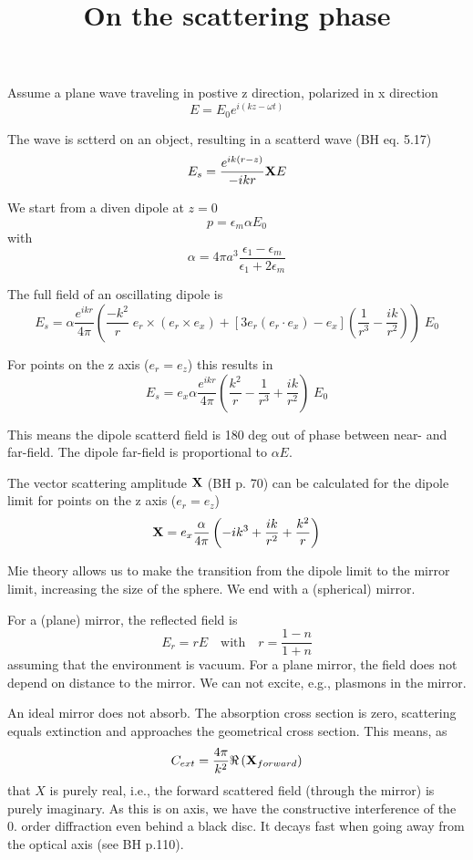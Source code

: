 \documentclass[a4paper,10pt]{article}
\title{On the scattering phase}
\author{}
\begin{document}
\maketitle

Assume a plane wave traveling in postive z direction, polarized in x direction
\[
 E = E_0 e^{ i (kz - \omega t) }
\]

The wave is sctterd on an object, resulting in a scatterd wave  (BH eq. 5.17)
\[
 E_s = \frac{e^{ik (r - z)}}{-i k r} {\bf X } E
\]


We start from a diven dipole at $z=0$
\[
 p = \epsilon_m \alpha E_0
\]
with
\[
 \alpha = 4 \pi a^3 \frac{\epsilon_1 - \epsilon_m}{\epsilon_1 + 2 \epsilon_m}
\]

The full field of an oscillating dipole is
\[
E_s = \alpha \frac{e^{i k r}}{4 \pi } \left(  
 \frac{-k^2}{r}  \; e_r \times  (e_r \times e_x)
 + \left[ 3 e_r (e_r \cdot e_x) - e_x \right]
\left( \frac{1}{r^3} - \frac{i k}{r^2} \right)
 \right) \; E_0
\]

For points on the z axis ($e_r = e_z$) this results in 
\[
E_s = e_x \alpha \frac{e^{i k r}}{4 \pi } \left(  
 \frac{ k^2}{r} 
 -
 \frac{1}{r^3} + \frac{i k}{r^2}  
 \right) \; E_0
\]

This means the dipole scatterd field is 180 deg out of phase between near- and
far-field. The dipole far-field is proportional to $\alpha E$.




The vector scattering amplitude $\bf{X}$  (BH p. 70) can be calculated for the
dipole limit for points on the z axis ($e_r = e_z$)
\[
 {\bf X} = e_x  \frac{\alpha}{4 \pi } \left(  
  -i k^3  
 +
 \frac{i k }{r^2} + \frac{ k^2}{r}  
 \right)  
\]

Mie theory allows us to make the transition from the dipole limit to the mirror
limit, increasing the size of the sphere. We end with a (spherical) mirror.

For a (plane) mirror, the reflected field is
\[
 E_r = r E  \quad \text{with} \quad r = \frac{1 - n}{ 1 + n}
\]
assuming that the environment is vacuum. For a plane mirror, the field does not
depend on distance to the mirror. We can not excite, e.g., plasmons in the
mirror.

An ideal mirror does not absorb. The absorption cross section is zero,
scattering equals extinction and approaches the geometrical cross section. This
means, as
\[
 C_{ext} = \frac{4 \pi}{k^2} \Re \left( {\bf X}_{forward} \right)
\]
that $X$ is purely real, i.e., the forward scattered field (through the mirror)
is purely imaginary. As this is on axis, we have the constructive interference
of the 0. order diffraction even behind a black disc. It decays fast when going
away from the optical axis (see BH p.110).
\end{document}
